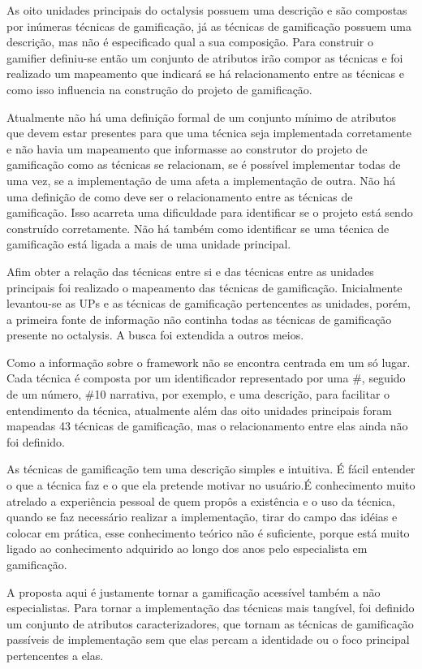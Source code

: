 As oito unidades principais do octalysis possuem uma descrição e são compostas por inúmeras técnicas de gamificação, já as técnicas de gamificação possuem uma descrição, mas não é especificado qual a sua composição.  Para construir o gamifier definiu-se então um conjunto de atributos irão compor as técnicas e foi realizado um mapeamento que indicará se há relacionamento entre as técnicas e como isso influencia na construção do projeto de gamificação.

Atualmente não há uma definição formal de um conjunto mínimo de atributos que devem estar presentes para que uma técnica seja implementada corretamente e não havia um mapeamento que informasse ao construtor do projeto de gamificação como as técnicas se relacionam, se é possível implementar todas de uma vez, se a implementação de uma afeta a implementação de outra. Não há uma definição de como deve ser o relacionamento entre as técnicas de gamificação. Isso acarreta uma dificuldade para identificar se o projeto está sendo construído corretamente. Não há também como identificar se uma técnica de gamificação está ligada a mais de uma unidade principal. 

Afim obter a relação das técnicas entre si e das técnicas entre as unidades principais foi realizado o mapeamento das técnicas de gamificação. Inicialmente levantou-se as UPs e as técnicas de gamificação pertencentes as unidades, porém, a primeira fonte de informação não continha todas as técnicas de gamificação presente no octalysis. A busca foi extendida a outros meios.

Como a informação sobre o framework não se encontra centrada em um só lugar. Cada técnica é composta por um identificador representado por uma \#, seguido de um número, \#10 narrativa, por exemplo, e uma descrição, para facilitar o entendimento da técnica, atualmente além das oito unidades principais foram mapeadas 43 técnicas de gamificação, mas o relacionamento entre elas ainda não foi definido.

As técnicas de gamificação tem uma descrição simples e intuitiva. É fácil entender o que a técnica faz e o que ela pretende motivar no usuário.É conhecimento muito atrelado a experiência pessoal de quem propôs a existência e o uso da técnica, quando se faz necessário realizar a implementação, tirar do campo das idéias e colocar em prática, esse conhecimento teórico não é suficiente, porque está muito ligado ao conhecimento adquirido ao longo dos anos pelo especialista em gamificação.

 A proposta aqui é justamente tornar a gamificação acessível também a não especialistas. Para tornar a implementação das técnicas mais tangível, foi definido um conjunto de atributos caracterizadores, que tornam as técnicas de gamificação passíveis de implementação sem que elas percam a identidade ou o foco principal pertencentes a elas. 

